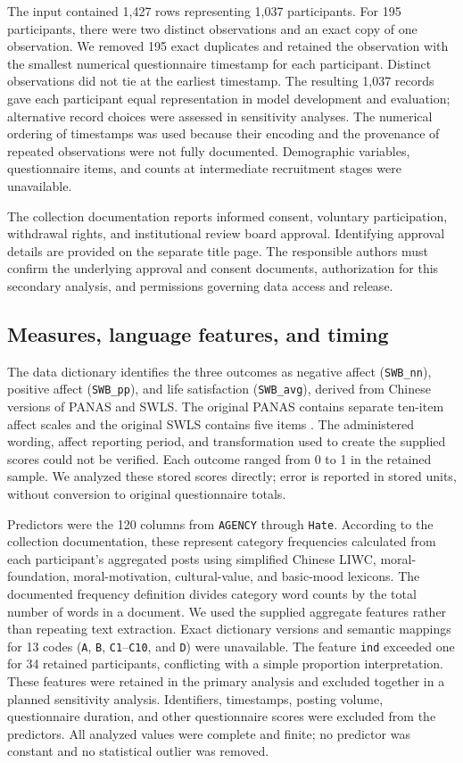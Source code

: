 The input contained 1,427 rows representing 1,037 participants. For 195 participants, there were two distinct observations and an exact copy of one observation. We removed 195 exact duplicates and retained the observation with the smallest numerical questionnaire timestamp for each participant. Distinct observations did not tie at the earliest timestamp. The resulting 1,037 records gave each participant equal representation in model development and evaluation; alternative record choices were assessed in sensitivity analyses. The numerical ordering of timestamps was used because their encoding and the provenance of repeated observations were not fully documented. Demographic variables, questionnaire items, and counts at intermediate recruitment stages were unavailable.

The collection documentation reports informed consent, voluntary participation, withdrawal rights, and institutional review board approval. Identifying approval details are provided on the separate title page. The responsible authors must confirm the underlying approval and consent documents, authorization for this secondary analysis, and permissions governing data access and release.

\subsection{Measures, language features, and timing}
The data dictionary identifies the three outcomes as negative affect (\texttt{SWB\_nn}), positive affect (\texttt{SWB\_pp}), and life satisfaction (\texttt{SWB\_avg}), derived from Chinese versions of PANAS and SWLS. The original PANAS contains separate ten-item affect scales and the original SWLS contains five items \citep{diener1985,watson1988}. The administered wording, affect reporting period, and transformation used to create the supplied scores could not be verified. Each outcome ranged from 0 to 1 in the retained sample. We analyzed these stored scores directly; error is reported in stored units, without conversion to original questionnaire totals.

Predictors were the 120 columns from \texttt{AGENCY} through \texttt{Hate}. According to the collection documentation, these represent category frequencies calculated from each participant's aggregated posts using simplified Chinese LIWC, moral-foundation, moral-motivation, cultural-value, and basic-mood lexicons. The documented frequency definition divides category word counts by the total number of words in a document. We used the supplied aggregate features rather than repeating text extraction. Exact dictionary versions and semantic mappings for 13 codes (\texttt{A}, \texttt{B}, \texttt{C1}--\texttt{C10}, and \texttt{D}) were unavailable. The feature \texttt{ind} exceeded one for 34 retained participants, conflicting with a simple proportion interpretation. These features were retained in the primary analysis and excluded together in a planned sensitivity analysis. Identifiers, timestamps, posting volume, questionnaire duration, and other questionnaire scores were excluded from the predictors. All analyzed values were complete and finite; no predictor was constant and no statistical outlier was removed.

